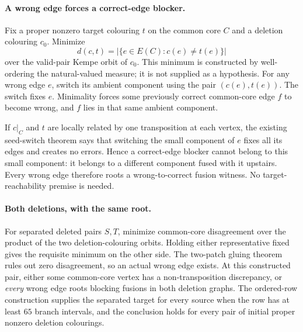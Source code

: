 \paragraph{A wrong edge forces a correct-edge blocker.}
Fix a proper nonzero target colouring $t$ on the common core $C$ and
a deletion colouring $c_0$. Minimize
\[
             d(c,t)=|\{e\in E(C):c(e)\ne t(e)\}|
\]
over the valid-pair Kempe orbit of $c_0$. This minimum is constructed
by well-ordering the natural-valued measure; it is not supplied as a
hypothesis. For any wrong edge $e$, switch its ambient component using
the pair $(c(e),t(e))$. The switch fixes $e$. Minimality forces some
previously correct common-core edge $f$ to become wrong, and $f$ lies
in that same ambient component.

If $c|_C$ and $t$ are locally related by one transposition at each vertex,
the existing seed-switch theorem says that switching the small component
of $e$ fixes all its edges and creates no errors. Hence a correct-edge
blocker cannot belong to this small component: it belongs to a different
component fused with it upstairs. Every wrong edge therefore roots a
wrong-to-correct fusion witness. No target-reachability premise is needed.

\paragraph{Both deletions, with the same root.}
For separated deleted pairs $S,T$, minimize common-core disagreement
over the product of the two deletion-colouring orbits. Holding either
representative fixed gives the requisite minimum on the other side.
The two-patch gluing theorem rules out zero disagreement, so an actual
wrong edge exists. At this constructed pair, either some common-core
vertex has a non-transposition discrepancy, or \emph{every} wrong edge
roots blocking fusions in both deletion graphs. The ordered-row
construction supplies the separated target for every source when the
row has at least $65$ branch intervals, and the conclusion holds for
every pair of initial proper nonzero deletion colourings.


